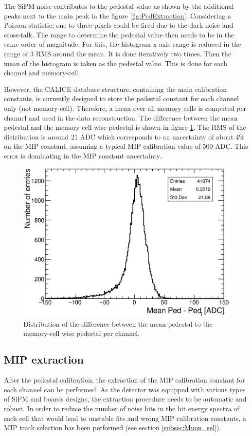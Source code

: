 The SiPM noise contributes to the pedestal value as shown by the additional peaks next to the main peak in the figure \ref{fig:PedExtraction}. Considering a Poisson statistic, one to three pixels could be fired due to the dark noise and cross-talk. The range to determine the pedestal value then needs to be in the same order of magnitude. For this, the histogram x-axis range is reduced in the range of 3 RMS around the mean. It is done iteratively two times. Then the mean of the histogram is taken as the pedestal value. This is done for each channel and memory-cell.

However, the CALICE database structure, containing the main calibration constants, is currently designed to store the pedestal constant for each channel only (not memory-cell). Therefore, a mean over all memory cells is computed per channel and used in the data reconstruction. The difference between the mean pedestal and the memory cell wise pedestal is shown in figure \ref{fig:CompMeanMem}. The RMS of the distribution is around 21 ADC which corresponds to an uncertainty of about 4\% on the MIP constant, assuming a typical MIP calibration value of 500 ADC. This error is dominating in the MIP constant uncertainty.

\begin{figure}[htbp!]
	\centering
	\includegraphics[width=0.6\linewidth]{../Thesis_Plots/EnergyCalib/Plots/ComparisonMeanPedtoMemorycell.eps}
	\caption{Distribution of the difference between the mean pedestal to the memory-cell wise pedestal per channel.} \label{fig:CompMeanMem}
\end{figure}

\subsection{MIP extraction}
\label{sec:MIPExtraction}

After the pedestal calibration, the extraction of the MIP calibration constant for each channel can be performed. As the detector was equipped with various types of SiPM and boards designs, the extraction procedure needs to be automatic and robust. In order to reduce the number of noise hits in the hit energy spectra of each cell that would lead to unstable fits and wrong MIP calibration constants, a MIP track selection has been performed (see section \ref{subsec:Muon_sel}).

